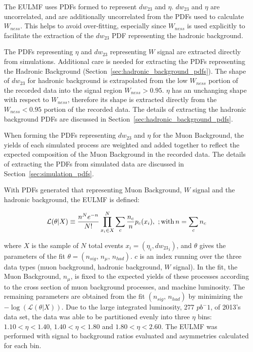 The EULMF uses PDFs formed to represent $dw_{23}$ and $\eta$. $dw_{23}$ and
$\eta$ are uncorrelated, and are additionally uncorrelated from the PDFs used to
calculate $W_{ness}$. This helps to avoid over-fitting, especially since
$W_{ness}$ is used explicitly to facilitate the extraction of the $dw_{23}$ PDF
representing the hadronic background. 

The PDFs representing $\eta$ and $dw_{23}$ representing  $W$ signal are
extracted directly from simulations. Additional care is needed for extracting
the PDFs representing the Hadronic Background
(Section~\ref{sec:hadronic_background_pdfs}). The shape of $dw_{23}$ for
hadronic background is extrapolated from the low $W_{ness}$ portion of the
recorded data into the signal region $W_{ness} > 0.95$. $\eta$ has an unchanging
shape with respect to $W_{ness}$, therefore its shape is extracted directly from
the $W_{ness} < 0.95$ portion of the recorded data. The details of extracting
the hadronic background PDFs are discussed in
Section~\ref{sec:hadronic_background_pdfs}.

When forming the PDFs representing $dw_{23}$ and $\eta$ for the Muon Background,
the yields of each simulated process are weighted and added together to reflect
the expected composition of the Muon Background in the recorded data. The
details of extracting the PDFs from simulated data are discussed in
Section~\ref{sec:simulation_pdfs}. 

{\noindent}With PDFs generated that representing Muon Background, $W$ signal and
the hadronic background, the EULMF is defined:

\begin{equation} 
  \mathcal{L}(\theta|X) 
  \equiv
  \frac{n^N e^{-n}}{N!} \prod_{x_i \in X}^N
  \sum_c \frac{n_c}{n} p_c (x_i), \
  ;{\rm with}\, 
  n=\sum_c n_c 
  \label{eq:likelihood_function}
\end{equation} 

{\noindent}where $X$ is the sample of $N$ total events $x_i =
(\eta_i,{dw_{23}}_i)$, and $\theta$ gives the parameters of the fit $\theta =
(n_{sig},\,n_\mu,\, n_{had})$. $c$ is an index running over the three data types
(muon background, hadronic background, $W$ signal). In the fit, the Muon
Background, $n_\mu$, is fixed to the expected yields of these processes
according to the cross section of muon background processes, and machine
luminosity. The remaining parameters are obtained from the fit $(n_{sig},\,
n_{had})$ by minimizing the $-\log(\mathcal{L}(\theta|X))$. Due to the large
integrated luminosity, 277 $pb^-1$, of 2013's data set, the data was able to be
partitioned evenly into three $\eta$ bins: $1.10 < \eta < 1.40$, $1.40 < \eta <
1.80$ and $1.80 < \eta < 2.60$. The EULMF was performed with signal to
background ratios evaluated and asymmetries calculated for each bin.

